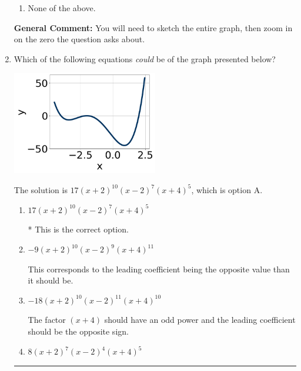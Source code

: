 \documentclass{extbook}[14pt]
\newcommand{\litem}[1]{\item #1

\rule{\textwidth}{0.4pt}}
\begin{document}
\begin{enumerate}
{\begin{enumerate}[label=\Alph*.]
\item None of the above.\end{enumerate}
\textbf{General Comment:} You will need to sketch the entire graph, then zoom in on the zero the question asks about.
}
\litem{
Which of the following equations \textit{could} be of the graph presented below?

\begin{center}
    \includegraphics[width=0.5\textwidth]{../Figures/polyGraphToFunctionB.png}
\end{center}


The solution is \( 17(x + 2)^{10} (x - 2)^{7} (x + 4)^{5} \), which is option A.\begin{enumerate}[label=\Alph*.]
\item \( 17(x + 2)^{10} (x - 2)^{7} (x + 4)^{5} \)

* This is the correct option.
\item \( -9(x + 2)^{10} (x - 2)^{9} (x + 4)^{11} \)

This corresponds to the leading coefficient being the opposite value than it should be.
\item \( -18(x + 2)^{10} (x - 2)^{11} (x + 4)^{10} \)

The factor $(x + 4)$ should have an odd power and the leading coefficient should be the opposite sign.
\item \( 8(x + 2)^{7} (x - 2)^{4} (x + 4)^{5} \)


\end{enumerate}}
\end{enumerate}
\end{document}
